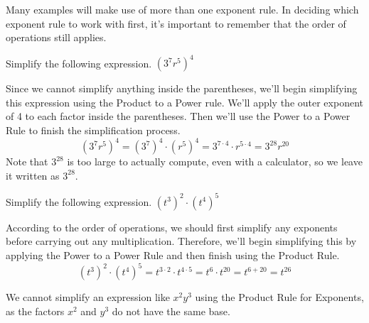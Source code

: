 \documentclass{ximera}
\begin{document}
      Many examples will make use of more than one exponent rule.
      In deciding which exponent rule to work with first,
      it's important to remember that the order of operations still applies.
\begin{example} Simplify the following expression.
                $\left(3^7r^5\right)^4$\\
    \begin{explanation}
                Since we cannot simplify anything inside the parentheses, we'll begin simplifying this expression using the Product to a Power rule.
                We'll apply the outer exponent of 4 to each factor inside the parentheses.
                Then we'll use the Power to a Power Rule to finish the simplification process.
      $$          
                  \left(3^7r^5\right)^4 = \left(3^7\right)^4 \cdot \left(r^5\right)^4
                  = 3^{7\cdot4} \cdot r^{5\cdot 4}
                  = 3^{28}r^{20}
         $$      
                Note that $3^{28}$ is too large to actually compute, even with a calculator,
                so we leave it written as $3^{28}$.
\end{explanation}
\end{example}
\begin{example}
Simplify the following expression.
       $\left(t^3\right)^2\cdot \left(t^4\right)^5$\\
\begin{explanation}
                According to the order of operations,
                we should first simplify any exponents before carrying out any multiplication.
                Therefore, we'll begin simplifying this by applying the Power to a Power Rule and then finish using the Product Rule.
           $$
                  \left(t^3\right)^2\cdot \left(t^4\right)^5 = t^{3\cdot2}\cdot t^{4\cdot5}
                  = t^6 \cdot t^{20}
                  = t^{6+20}
                  = t^{26}
$$
\end{explanation}
\end{example}
 \begin{remark} 
        We cannot simplify an expression like $x^2y^3$ using the Product Rule for Exponents,
        as the factors $x^2$ and $y^3$ do not have the same base.
\end{remark}
\end{document}
